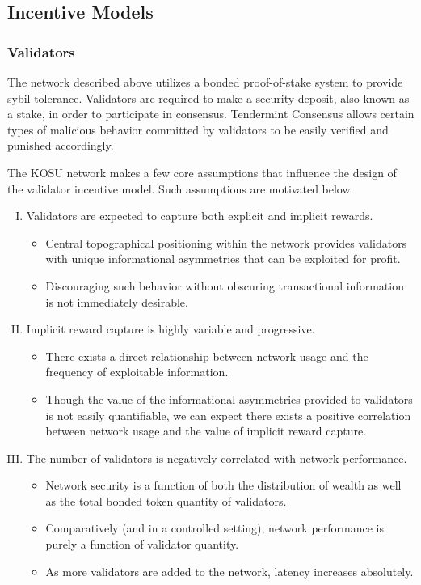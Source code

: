 \documentclass[10pt]{article}
\begin{document}
\subsection{Incentive Models}\label{incentive-models}

\subsubsection{Validators}\label{incentive-models-validators}
The network described above utilizes a bonded proof-of-stake system to provide sybil tolerance. Validators are required to make a security deposit, also known as a stake, in order to participate in consensus. Tendermint Consensus allows certain types of malicious behavior committed by validators to be easily verified and punished accordingly. 
\medskip

The KOSU network makes a few core assumptions that influence the design of the validator incentive model. Such assumptions are motivated below.

\begin{enumerate}[I.]
  \item Validators are expected to capture both explicit and implicit rewards.
  \begin{itemize}
    \item Central topographical positioning within the network provides validators with unique informational asymmetries that can be exploited for profit.
    \item Discouraging such behavior without obscuring transactional information is not immediately desirable.
  \end{itemize}
  \item Implicit reward capture is highly variable and progressive.
  \begin{itemize}
    \item There exists a direct relationship between network usage and the frequency of exploitable information.
    \item Though the value of the informational asymmetries provided to validators is not easily quantifiable, we can expect there exists a positive correlation between network usage and the value of implicit reward capture.
  \end{itemize}
  \item The number of validators is negatively correlated with network performance.
  \begin{itemize}
    \item Network security is a function of both the distribution of wealth as well as the total bonded token quantity of validators.
    \item Comparatively (and in a controlled setting), network performance is purely a function of validator quantity.
    \item As more validators are added to the network, latency increases absolutely.
  \end{itemize}
\end{enumerate}
\end{document}
